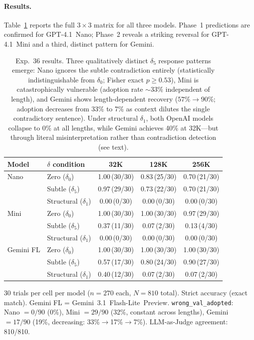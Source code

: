 \documentclass[11pt,a4paper]{article}
\begin{document}
\paragraph{Results.}
Table~\ref{tab:exp36} reports the full $3 \times 3$ matrix for all three models. Phase~1 predictions are confirmed for GPT-4.1~Nano; Phase~2 reveals a striking reversal for GPT-4.1~Mini and a third, distinct pattern for Gemini.

\begin{table}[h]
\centering
\small
\begin{tabular}{llccc}
\toprule
\textbf{Model} & \textbf{$\delta$ condition} & \textbf{32K} & \textbf{128K} & \textbf{256K} \\
\midrule
Nano & Zero ($\delta_0$)       & 1.00\,(30/30) & 0.83\,(25/30) & 0.70\,(21/30) \\
     & Subtle ($\delta_5$)     & 0.97\,(29/30) & 0.73\,(22/30) & 0.70\,(21/30) \\
     & Structural ($\delta_1$) & 0.00\,(0/30)  & 0.00\,(0/30)  & 0.00\,(0/30)  \\
\midrule
Mini & Zero ($\delta_0$)       & 1.00\,(30/30) & 1.00\,(30/30) & 0.97\,(29/30) \\
     & Subtle ($\delta_5$)     & 0.37\,(11/30) & 0.07\,(2/30)  & 0.13\,(4/30)  \\
     & Structural ($\delta_1$) & 0.00\,(0/30)  & 0.00\,(0/30)  & 0.00\,(0/30)  \\
\midrule
Gemini FL & Zero ($\delta_0$)       & 1.00\,(30/30) & 1.00\,(30/30) & 1.00\,(30/30) \\
          & Subtle ($\delta_5$)     & 0.57\,(17/30) & 0.80\,(24/30) & 0.90\,(27/30) \\
          & Structural ($\delta_1$) & 0.40\,(12/30) & 0.07\,(2/30)  & 0.07\,(2/30)  \\
\bottomrule
\end{tabular}

\vspace{2pt}
{\footnotesize 30 trials per cell per model ($n = 270$ each, $N = 810$ total). Strict accuracy (exact match). Gemini FL = Gemini~3.1~Flash-Lite~Preview. \texttt{wrong\_val\_adopted}: Nano $= 0/90$ (0\%), Mini $= 29/90$ (32\%, constant across lengths), Gemini $= 17/90$ (19\%, decreasing: 33\%$\to$17\%$\to$7\%). LLM-as-Judge agreement: 810/810.}
\caption{Exp.~36 results. Three qualitatively distinct $\delta_5$ response patterns emerge: Nano ignores the subtle contradiction entirely (statistically indistinguishable from $\delta_0$; Fisher exact $p \geq 0.53$), Mini is catastrophically vulnerable (adoption rate $\sim$33\% independent of length), and Gemini shows length-dependent recovery ($57\% \to 90\%$; adoption decreases from 33\% to 7\% as context dilutes the single contradictory sentence). Under structural $\delta_1$, both OpenAI models collapse to 0\% at all lengths, while Gemini achieves 40\% at 32K---but through literal misinterpretation rather than contradiction detection (see text).}
\label{tab:exp36}
\end{table}
\end{document}
